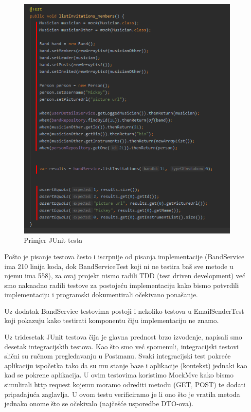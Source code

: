 			\begin{figure}[H]
				\begin{center}
					\includegraphics[width=13cm]{slike/junit_test.PNG}
				\end{center}
				\caption{Primjer JUnit testa}
				\label{fig:junit}
			\end{figure}
		
			
			Pošto je pisanje testova često i iscrpnije od pisanja implementacije (BandService ima 210 linija koda, dok BandServiceTest koji ni ne testira baš sve metode u njemu ima 558), za ovaj projekt nismo radili TDD (test driven development) već smo naknadno radili testove za postojeću implementaciju kako bismo potvrdili implementaciju i programski dokumentirali očekivano ponašanje.
			
			Uz dodatak BandService testovima postoji i nekoliko testova u EmailSenderTest koji pokazuju kako testirati komponentu čiju implementaciju ne znamo.
			
			
			Uz tridesetak JUnit testova čija je glavna prednost brzo izvođenje, napisali smo desetak integracijskih testova. Kao što smo već spomenuli, integracijski testovi slični su ručnom pregledavanju u Postmanu. Svaki integracijski test pokreće aplikaciju ispočetka tako da su mu stanje baze i aplikacije (kontekst) jednaki kao kad se pokrene aplikacija. U ovim testovima koristimo MockMvc kako bismo simulirali http request kojemu moramo odrediti metodu (GET, POST) te dodati pripadajuća zaglavlja. U ovom testu verificiramo je li ono što je vratila metoda jednako onome što se očekivalo (najčešće usporedbe DTO-ova).
			
